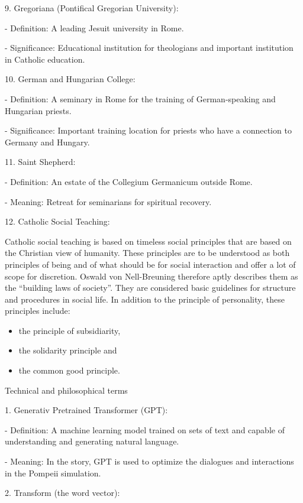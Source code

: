 \documentclass[
]{article}
\begin{document}
9. Gregoriana (Pontifical Gregorian University):

- Definition: A leading Jesuit university in Rome.

- Significance: Educational institution for theologians and important
institution in Catholic education.

10. German and Hungarian College:

- Definition: A seminary in Rome for the training of German-speaking and
Hungarian priests.

- Significance: Important training location for priests who have a
connection to Germany and Hungary.

11. Saint Shepherd:

- Definition: An estate of the Collegium Germanicum outside Rome.

- Meaning: Retreat for seminarians for spiritual recovery.

12. Catholic Social Teaching:

Catholic social teaching is based on timeless social principles that are
based on the Christian view of humanity. These principles are to be
understood as both principles of being and of what should be for social
interaction and offer a lot of scope for discretion. Oswald von
Nell-Breuning therefore aptly describes them as the ``building laws of
society''. They are considered basic guidelines for structure and
procedures in social life. In addition to the principle of personality,
these principles include:

\begin{itemize}
\item
  the principle of subsidiarity,
\end{itemize}

\begin{itemize}
\item
  the solidarity principle and
\item
  the common good principle.
\end{itemize}

Technical and philosophical terms

1. Generativ Pretrained Transformer (GPT):

- Definition: A machine learning model trained on sets of text and
capable of understanding and generating natural language.

- Meaning: In the story, GPT is used to optimize the dialogues and
interactions in the Pompeii simulation.

2. Transform (the word vector):
\end{document}
